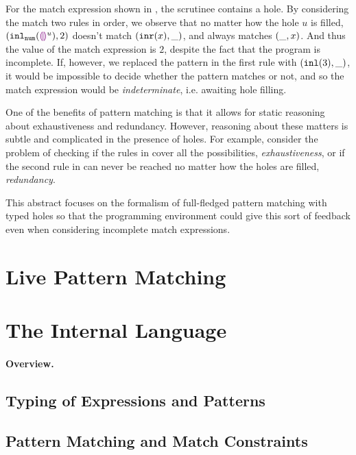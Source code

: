 \documentclass[runningheads,envcountsame,a4paper]{llncs}
\begin{document}
For the match expression shown in , the scrutinee contains a hole.
By considering the match two rules in order, we observe that
no matter how the hole $u$ is filled, $(\mathtt{inl}_{\mathtt{num}}({\textcolor{violet}{\llparenthesis}\textcolor{violet}{\rrparenthesis}^{u}}) , 2)$ doesn't match $(\mathtt{inr}(x) , \_)$,
and always matches $(\_ , x)$. And thus the value of the match expression is $2$, despite the fact that the program is incomplete.
If, however, we replaced the pattern in the first rule with $(\mathtt{inl}(3), \_)$, it would be impossible to decide whether the pattern matches
or not, and so the match expression would be \emph{indeterminate}, i.e. awaiting hole filling.

One of the benefits of pattern matching is that it allows for static reasoning about exhaustiveness and redundancy.
However, reasoning about these matters is subtle and complicated in the presence of holes. 
For example, consider the problem of checking if the rules in  cover all the possibilities, \ie \emph{exhaustiveness}, or if the second rule in  can never be reached no matter how the holes are filled, \ie \emph{redundancy}. 

This abstract focuses on the formalism of full-fledged pattern matching with typed holes so that the programming environment could give this sort of feedback even when considering incomplete match expressions.

\section{Live Pattern Matching}

\section{The Internal Language}


\paragraph{Overview.}
\subsection{Typing of Expressions and Patterns}


\subsection{Pattern Matching and Match Constraints}




\end{document}
